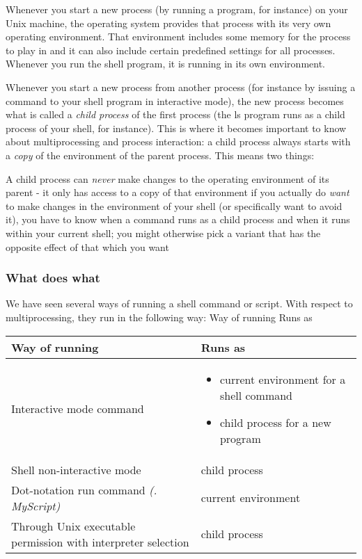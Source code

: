 Whenever you start a new process (by running a program, for instance) on your
Unix machine, the operating system provides that process with its very own
operating environment. That environment includes some memory for the process to
play in and it can also include certain predefined settings for all processes.
Whenever you run the shell program, it is running in its own environment.

Whenever you start a new process from another process (for instance by issuing
a command to your shell program in interactive mode), the new process becomes
what is called a \textit{child process} of the first process (the ls program
runs as a child process of your shell, for instance). This is where it becomes
important to know about multiprocessing and process interaction: a child
process always starts with a \textit{copy} of the environment of the parent
process. This means two things:

A child process can \textit{never} make changes to the operating environment
of its parent - it only has access to a copy of that environment if you
actually do \textit{want} to make changes in the environment of your shell (or
specifically want to avoid it), you have to know when a command runs as a child
process and when it runs within your current shell; you might otherwise pick a
variant that has the opposite effect of that which you want

\subsubsection{What does what}
We have seen several ways of running a shell command or script. With respect to
multiprocessing, they run in the following way:
Way of running Runs as

\begin{tabular}{|p{4cm}|p{4cm}|}
\hline
Way of running & Runs as\\ \hline
Interactive mode command & \begin{itemize}
\item current environment for a shell command
\item child process for a new program
\end{itemize} \\ \hline
Shell non-interactive mode &child process\\ \hline
Dot-notation run command \textit{(. MyScript)} & current environment\\ \hline
Through Unix executable permission with interpreter selection & child process\\
\hline
\end{tabular}

